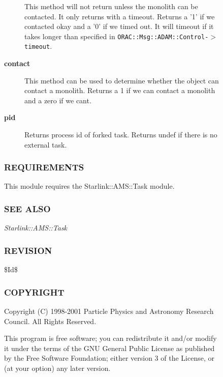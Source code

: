 \begin{description}
\begin{description}
\begin{description}
This method will not return unless the monolith can be contacted.
It only returns with a timeout. Returns a '1' if we contacted okay
and a '0' if we timed out. It will timeout if it takes longer than
specified in \texttt{ORAC::Msg::ADAM::Control-$>$timeout}.


\item[{\textbf{contact}}] \mbox{}

This method can be used to determine whether the object can
contact a monolith. Returns a 1 if we can contact a monolith and
a zero if we cant.


\item[{\textbf{pid}}] \mbox{}

Returns process id of forked task.
Returns undef if there is no external task.

\end{description}
\subsubsection*{REQUIREMENTS\label{ORAC::Msg::Task::ADAM_REQUIREMENTS}}


This module requires the Starlink::AMS::Task module.

\subsubsection*{SEE ALSO\label{ORAC::Msg::Task::ADAM_SEE_ALSO}}


\emph{Starlink::AMS::Task}

\subsubsection*{REVISION\label{ORAC::Msg::Task::ADAM_REVISION}}


\$Id\$

\subsubsection*{COPYRIGHT\label{ORAC::Msg::Task::ADAM_COPYRIGHT}}


Copyright (C) 1998-2001 Particle Physics and Astronomy Research
Council. All Rights Reserved.



This program is free software; you can redistribute it and/or modify it under
the terms of the GNU General Public License as published by the Free Software
Foundation; either version 3 of the License, or (at your option) any later
version.




\end{description}
\end{description}
